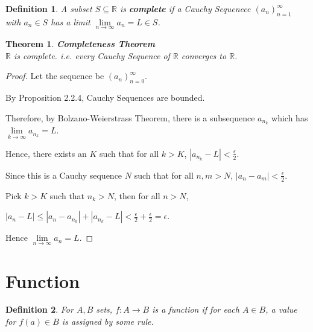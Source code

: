 \documentclass[12pt]{article}
\newcommand{\abs}[1]{\left| #1 \right|}
\theoremstyle{plain}
\newtheorem{theorem}{Theorem}[subsection]
\newtheorem{definition}{Definition}[subsection]
\newcommand{\dlim}{\displaystyle\lim\limits}
\begin{document}
    \begin{definition}
        A subset $S\subseteq \mathbb{R}$ is \textbf{complete} if a Cauchy Sequenece
        $(a_n)_{n=1}^\infty$ with $a_n\in S$ has a limit 
        $\dlim_{n\to\infty} a_n=L \in S$. \\
    \end{definition}

    {\color{Blue} \begin{theorem}\textbf{Completeness Theorem}\\
        $\mathbb{R}$ is complete. i.e. every Cauchy Sequence of $\mathbb{R}$ converges to $\mathbb{R}$.
    \end{theorem}

    \begin{proof}
        Let the sequence be $(a_n)^{\infty}_{n=0}$. 

        By Proposition 2.2.4, Cauchy Sequences are bounded. 

        Therefore, by Bolzano-Weierstrass Theorem, there is a 
        subsequence $a_{n_k}$ which has $\dlim_{k\to\infty} a_{n_k} = L$.
        
        Hence, there exists an $K$ such that for all $k>K$,
        $\abs{a_{n_k}-L}<\frac{\epsilon}2$.
        
        Since this is a Cauchy sequence $N$ such that for all $n, m>N$, 
        $\abs{a_n - a_m} < \frac{\epsilon}2$. 

        Pick $k>K$ such that $n_k>N$, then for all $n > N$, 
        
        $\abs{a_n-L}\leq \abs{a_n-a_{n_k}}+\abs{a_{n_k}-L}
        <\frac{\epsilon}2 +\frac{\epsilon}2=\epsilon$.

        Hence $\dlim_{n\to\infty} a_n = L$. 
    \end{proof}}

    \newpage

\section{Function}
	\begin{definition}
	For $A, B$ sets, $f: A \to B$ is a function if for each $A\in B$, 
    a value for $f(a) \in B$ is assigned by some rule. \\
	\end{definition}
\end{document}
